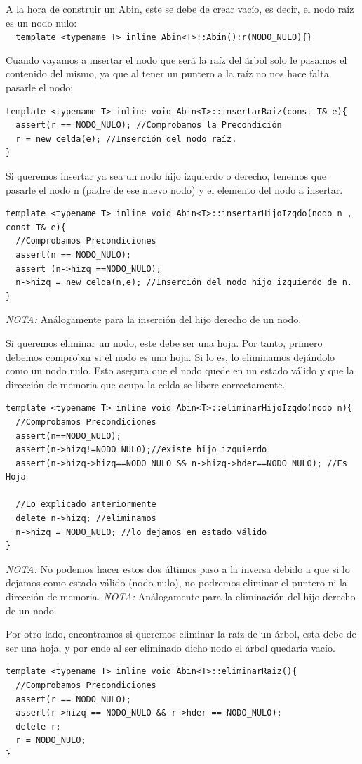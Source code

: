A la hora de construir un Abin, este se debe de crear vacío, es decir, el nodo raíz es un nodo nulo:\\
\verb|  template <typename T> inline Abin<T>::Abin():r(NODO_NULO){}|

Cuando vayamos a insertar el nodo que será la raíz del árbol solo le pasamos el contenido del mismo, ya que al tener un puntero a la raíz no nos hace falta pasarle el nodo:
\begin{verbatim}
template <typename T> inline void Abin<T>::insertarRaiz(const T& e){
  assert(r == NODO_NULO); //Comprobamos la Precondición
  r = new celda(e); //Inserción del nodo raíz.
}
\end{verbatim}

Si queremos insertar ya sea un nodo hijo izquierdo o derecho, tenemos que pasarle el nodo n (padre de ese nuevo nodo) y el elemento del nodo a insertar.
\begin{verbatim}
template <typename T> inline void Abin<T>::insertarHijoIzqdo(nodo n , const T& e){
  //Comprobamos Precondiciones
  assert(n == NODO_NULO); 
  assert (n->hizq ==NODO_NULO);
  n->hizq = new celda(n,e); //Inserción del nodo hijo izquierdo de n.
}
\end{verbatim}
\textit{NOTA:} Análogamente para la inserción del hijo derecho de un nodo.

Si queremos eliminar un nodo, este debe ser una hoja. Por tanto, primero debemos comprobar si el nodo es una hoja. Si lo es, lo eliminamos dejándolo como un nodo nulo. Esto asegura que el nodo quede en un estado válido y que la dirección de memoria que ocupa la celda se libere correctamente.
\begin{verbatim}
template <typename T> inline void Abin<T>::eliminarHijoIzqdo(nodo n){
  //Comprobamos Precondiciones
  assert(n==NODO_NULO);
  assert(n->hizq!=NODO_NULO);//existe hijo izquierdo
  assert(n->hizq->hizq==NODO_NULO && n->hizq->hder==NODO_NULO); //Es Hoja

  //Lo explicado anteriormente
  delete n->hizq; //eliminamos
  n->hizq = NODO_NULO; //lo dejamos en estado válido
}
\end{verbatim}
\textit{NOTA:} No podemos hacer estos dos últimos paso a la inversa debido a que si lo dejamos como estado válido (nodo nulo), no podremos eliminar el puntero ni la dirección de memoria.
\textit{NOTA:} Análogamente para la eliminación del hijo derecho de un nodo.

Por otro lado, encontramos si queremos eliminar la raíz de un árbol, esta debe de ser una hoja, y por ende al ser eliminado dicho nodo el árbol quedaría vacío.
\begin{verbatim}
template <typename T> inline void Abin<T>::eliminarRaiz(){
  //Comprobamos Precondiciones
  assert(r == NODO_NULO);
  assert(r->hizq == NODO_NULO && r->hder == NODO_NULO);
  delete r;
  r = NODO_NULO;
}
\end{verbatim}

